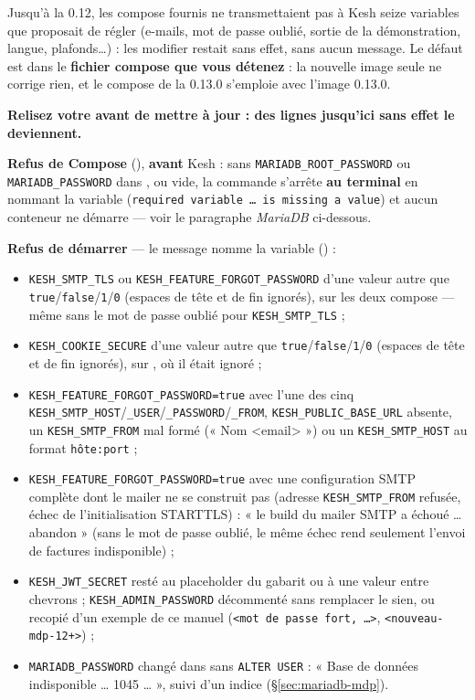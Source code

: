 \documentclass[a4paper,11pt,oneside]{article}
\begin{document}
Jusqu'à la 0.12, les compose fournis ne transmettaient pas à Kesh seize variables que  proposait de régler (e-mails, mot de passe oublié, sortie de la démonstration, langue, plafonds…) : les modifier restait sans effet, sans aucun message. Le défaut est dans le \textbf{fichier compose que vous détenez} : la nouvelle image seule ne corrige rien, et le compose de la 0.13.0 s'emploie avec l'image 0.13.0.

\begin{keshwarning}
\textbf{Relisez votre  avant de mettre à jour : des lignes jusqu'ici sans effet le deviennent.}

\textbf{Refus de Compose} (), \textbf{avant} Kesh : sans \texttt{MARIADB\_ROOT\_PASSWORD} ou \texttt{MARIADB\_PASSWORD} dans , ou vide, la commande s'arrête \textbf{au terminal} en nommant la variable (\texttt{required variable … is missing a value}) et aucun conteneur ne démarre --- voir le paragraphe \emph{MariaDB} ci-dessous.

\textbf{Refus de démarrer} --- le message nomme la variable () :
\begin{itemize}
    \item \texttt{KESH\_SMTP\_TLS} ou \texttt{KESH\_FEATURE\_FORGOT\_PASSWORD} d'une valeur autre que \texttt{true}/\texttt{false}/\texttt{1}/\texttt{0} (espaces de tête et de fin ignorés), sur les deux compose --- même sans le mot de passe oublié pour \texttt{KESH\_SMTP\_TLS} ;
    \item \texttt{KESH\_COOKIE\_SECURE} d'une valeur autre que \texttt{true}/\texttt{false}/\texttt{1}/\texttt{0} (espaces de tête et de fin ignorés), sur , où il était ignoré ;
    \item \texttt{KESH\_FEATURE\_FORGOT\_PASSWORD=true} avec l'une des cinq \texttt{KESH\_SMTP\_HOST}/\texttt{\_USER}/\texttt{\_PASSWORD}/\texttt{\_FROM}, \texttt{KESH\_PUBLIC\_BASE\_URL} absente, un \texttt{KESH\_SMTP\_FROM} mal formé (« Nom <email> ») ou un \texttt{KESH\_SMTP\_HOST} au format \texttt{hôte:port} ;
    \item \texttt{KESH\_FEATURE\_FORGOT\_PASSWORD=true} avec une configuration SMTP complète dont le mailer ne se construit pas (adresse \texttt{KESH\_SMTP\_FROM} refusée, échec de l'initialisation STARTTLS) : « le build du mailer SMTP a échoué … abandon » (sans le mot de passe oublié, le même échec rend seulement l'envoi de factures indisponible) ;
    \item \texttt{KESH\_JWT\_SECRET} resté au placeholder du gabarit ou à une valeur entre chevrons ; \texttt{KESH\_ADMIN\_PASSWORD} décommenté sans remplacer le sien, ou recopié d'un exemple de ce manuel (\texttt{<mot de passe fort, …>}, \texttt{<nouveau-mdp-12+>}) ;
    \item \texttt{MARIADB\_PASSWORD} changé dans  sans \texttt{ALTER USER} : « Base de données indisponible … 1045 … », suivi d'un indice (\S\ref{sec:mariadb-mdp}).
\end{itemize}


\end{keshwarning}
\end{document}
